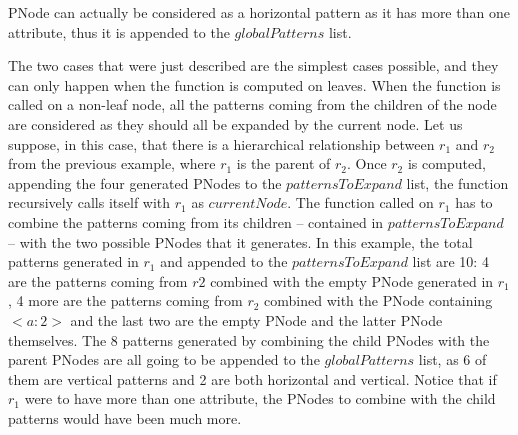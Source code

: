 \documentclass{acm_proc_article-sp-sigmod09}
\begin{document}
PNode can actually be considered as a horizontal pattern as it has more than one attribute, thus it is appended to the $globalPatterns$ list. 

The two cases that were just described are the simplest cases possible, and they can only happen when the function is computed on leaves. When the function is called on a non-leaf node, all the patterns coming from the children of the node are considered as they should all be expanded by the current node. Let us suppose, in this case, that there is a hierarchical relationship between $r_1$ and $r_2$ from the previous example, where $r_1$ is the parent of $r_2$. Once $r_2$ is computed, appending the four generated PNodes to the $patternsToExpand$ list, the function recursively calls itself with $r_1$ as $currentNode$. The function called on $r_1$ has to combine the patterns coming from its children -- contained in $patternsToExpand$ -- with the two possible PNodes that it generates. In this example, the total patterns generated in $r_1$ and appended to the $patternsToExpand$ list are 10: 4 are the patterns coming from $r2$ combined with the empty PNode generated in $r_1$, 4 more are the patterns coming from $r_2$ combined with the PNode containing $<a \colon 2>$ and the last two are the empty PNode and the latter PNode themselves. The 8 patterns generated by combining the child PNodes with the parent PNodes are all going to be appended to the $globalPatterns$ list, as 6 of them are vertical patterns and 2 are both horizontal and vertical. Notice that if $r_1$ were to have more than one attribute, the PNodes to combine with the child patterns would have been much more.
\end{document}
